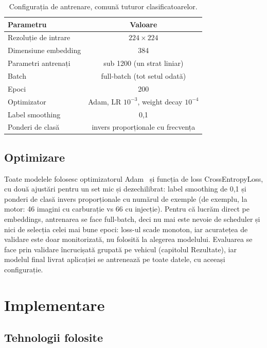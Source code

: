 \documentclass[12pt, a4paper, openany]{book}
\begin{document}
\begin{table}[H]
\centering
\caption{Configurația de antrenare, comună tuturor clasificatoarelor.}
\label{tab:config_antrenare}
\begin{tabular}{l c}
\toprule
\textbf{Parametru} & \textbf{Valoare} \\
\midrule
Rezoluție de intrare       & $224 \times 224$ \\
Dimensiune embedding       & 384 \\
Parametri antrenați        & sub 1200 (un strat liniar) \\
Batch                      & full-batch (tot setul odată) \\
Epoci                      & 200 \\
Optimizator                & Adam, LR $10^{-3}$, weight decay $10^{-4}$ \\
Label smoothing            & 0,1 \\
Ponderi de clasă           & invers proporționale cu frecvența \\
\bottomrule
\end{tabular}
\end{table}

\section{Optimizare}

Toate modelele folosesc optimizatorul Adam~\cite{kingma2015adam} și funcția de loss CrossEntropyLoss, cu două ajustări pentru un set mic și dezechilibrat: label smoothing de 0,1 și ponderi de clasă invers proporționale cu numărul de exemple (de exemplu, la motor: 46 imagini cu carburație vs 66 cu injecție). Pentru că lucrăm direct pe embeddings, antrenarea se face full-batch, deci nu mai este nevoie de scheduler și nici de selecția celei mai bune epoci: loss-ul scade monoton, iar acuratețea de validare este doar monitorizată, nu folosită la alegerea modelului. Evaluarea se face prin validare încrucișată grupată pe vehicul (capitolul Rezultate), iar modelul final livrat aplicației se antrenează pe toate datele, cu aceeași configurație.

\chapter{Implementare}
\section{Tehnologii folosite}
\end{document}
